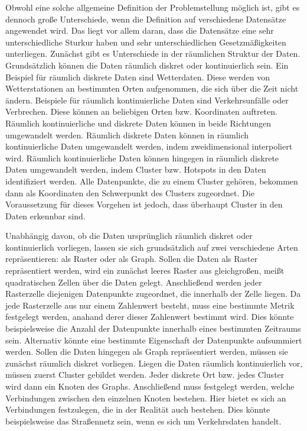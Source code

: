 Obwohl eine solche allgemeine Definition der Problemstellung möglich ist, gibt es dennoch große Unterschiede, wenn die Definition auf verschiedene Datensätze angewendet wird.
Das liegt vor allem daran, dass die Datensätze eine sehr unterschiedliche Sturkur haben und sehr unterschiedlichen Gesetzmäßigkeiten unterliegen.
Zunächst gibt es Unterschiede in der räumlichen Struktur der Daten.
Grundsätzlich können die Daten räumlich diskret oder kontinuierlich sein.
Ein Beispiel für räumlich diskrete Daten sind Wetterdaten.
Diese werden von Wetterstationen an bestimmten Orten aufgenommen, die sich über die Zeit nicht ändern.
Beispiele für räumlich kontinuierliche Daten sind Verkehrsunfälle oder Verbrechen.
Diese können an beliebigen Orten bzw. Koordinaten auftreten.
Räumlich kontinuierliche und diskrete Daten können in beide Richtungen umgewandelt werden.
Räumlich diskrete Daten können in räumlich kontinuierliche Daten umgewandelt werden, indem zweidimensional interpoliert wird.
Räumlich kontinuierliche Daten können hingegen in räumlich diskrete Daten umgewandelt werden, indem Cluster bzw. Hotspots in den Daten identifiziert werden.
Alle Datenpunkte, die zu einem Cluster gehören, bekommen dann als Koordinaten den Schwerpunkt des Clusters zugeordnet.
Die Voraussetzung für dieses Vorgehen ist jedoch, dass überhaupt Cluster in den Daten erkennbar sind.

Unabhängig davon, ob die Daten ursprünglich räumlich diskret oder kontinuierlich vorliegen, lassen sie sich grundsätzlich auf zwei verschiedene Arten repräsentieren: als Raster oder als Graph.
Sollen die Daten als Raster repräsentiert werden, wird ein zunächst leeres Raster aus gleichgroßen, meißt quadratischen Zellen über die Daten gelegt.
Anschließend werden jeder Rasterzelle diejenigen Datenpunkte zugeordnet, die innerhalb der Zelle liegen.
Da jede Rasterzelle aus nur einem Zahlenwert besteht, muss eine bestimmte Metrik festgelegt werden, anahand derer dieser Zahlenwert bestimmt wird.
Dies könnte beispielsweise die Anzahl der Datenpunkte innerhalb eines bestimmten Zeitraums sein.
Alternativ könnte eine bestimmte Eigenschaft der Datenpunkte aufsummiert werden.
Sollen die Daten hingegen als Graph repräsentiert werden, müssen sie zunächst räumlich diskret vorliegen.
Liegen die Daten räumlich kontinuierlich vor, müssen zuerst Cluster gebildet werden.
Jeder diskrete Ort bzw. jedes Cluster wird dann ein Knoten des Graphs.
Anschließend muss festgelegt werden, welche Verbindungen zwischen den einzelnen Knoten bestehen.
Hier bietet es sich an Verbindungen festzulegen, die in der Realität auch bestehen.
Dies könnte beispielsweise das Straßennetz sein, wenn es sich um Verkehrsdaten handelt.

